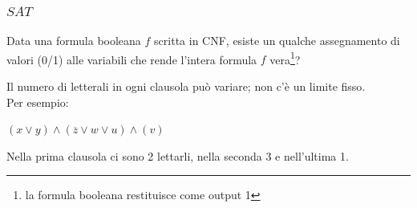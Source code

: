 \documentclass{article}  %
\theoremstyle{definition}
\begin{document}
\subsubsection{$SAT$}
Data una formula booleana $f$ scritta in CNF, esiste un qualche assegnamento di valori (0/1) alle variabili che rende l'intera formula $f$ vera\footnote{la formula booleana
	restituisce come output 1}?
\begin{osservazioni}[Osservazione]
	\footnotesize
	Il numero di letterali in ogni clausola può variare; non c'è un limite fisso. \\
	Per esempio:
	\begin{center}
		$(x \lor y) \land (\overline{z} \lor w \lor u) \land (v)$
	\end{center}
	Nella prima clausola ci sono 2 lettarli, nella seconda 3 e nell'ultima 1.
\end{osservazioni}
\end{document}
